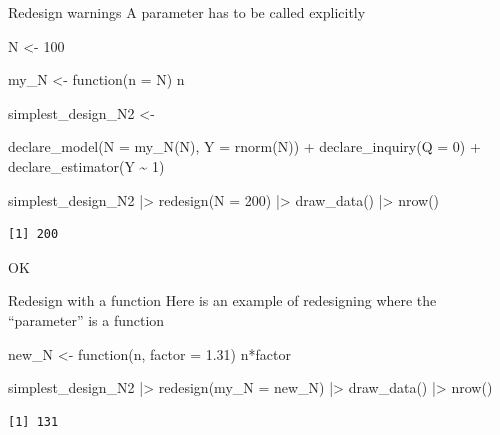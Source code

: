 \documentclass[
  11pt,
  ignorenonframetext,
]{beamer}
\newenvironment{Shaded}{\begin{snugshade}}{\end{snugshade}}
\newcommand{\AttributeTok}[1]{\textcolor[rgb]{0.40,0.45,0.13}{#1}}
\newcommand{\ControlFlowTok}[1]{\textcolor[rgb]{0.00,0.23,0.31}{#1}}
\newcommand{\DecValTok}[1]{\textcolor[rgb]{0.68,0.00,0.00}{#1}}
\newcommand{\FloatTok}[1]{\textcolor[rgb]{0.68,0.00,0.00}{#1}}
\newcommand{\FunctionTok}[1]{\textcolor[rgb]{0.28,0.35,0.67}{#1}}
\newcommand{\NormalTok}[1]{\textcolor[rgb]{0.00,0.23,0.31}{#1}}
\newcommand{\OtherTok}[1]{\textcolor[rgb]{0.00,0.23,0.31}{#1}}
\newcommand{\SpecialCharTok}[1]{\textcolor[rgb]{0.37,0.37,0.37}{#1}}
\begin{document}
\begin{frame}[fragile]{Redesign warnings}
\protect\hypertarget{redesign-warnings-2}{}
A parameter has to be called explicitly

\begin{Shaded}
\begin{Highlighting}[]
\NormalTok{N }\OtherTok{\textless{}{-}} \DecValTok{100}

\NormalTok{my\_N }\OtherTok{\textless{}{-}} \ControlFlowTok{function}\NormalTok{(}\AttributeTok{n =}\NormalTok{ N) n}

\NormalTok{simplest\_design\_N2 }\OtherTok{\textless{}{-}} 
  
  \FunctionTok{declare\_model}\NormalTok{(}\AttributeTok{N =} \FunctionTok{my\_N}\NormalTok{(N), }\AttributeTok{Y =} \FunctionTok{rnorm}\NormalTok{(N)) }\SpecialCharTok{+}
  \FunctionTok{declare\_inquiry}\NormalTok{(}\AttributeTok{Q =} \DecValTok{0}\NormalTok{) }\SpecialCharTok{+}
  \FunctionTok{declare\_estimator}\NormalTok{(Y }\SpecialCharTok{\textasciitilde{}} \DecValTok{1}\NormalTok{)}

\NormalTok{simplest\_design\_N2 }\SpecialCharTok{|\textgreater{}} \FunctionTok{redesign}\NormalTok{(}\AttributeTok{N =} \DecValTok{200}\NormalTok{) }\SpecialCharTok{|\textgreater{}} \FunctionTok{draw\_data}\NormalTok{() }\SpecialCharTok{|\textgreater{}} \FunctionTok{nrow}\NormalTok{()}
\end{Highlighting}
\end{Shaded}

\begin{verbatim}
[1] 200
\end{verbatim}

OK
\end{frame}

\begin{frame}[fragile]{Redesign with a function}
\protect\hypertarget{redesign-with-a-function}{}
Here is an example of redesigning where the ``parameter'' is a function

\begin{Shaded}
\begin{Highlighting}[]
\NormalTok{new\_N }\OtherTok{\textless{}{-}} \ControlFlowTok{function}\NormalTok{(n, }\AttributeTok{factor =} \FloatTok{1.31}\NormalTok{) n}\SpecialCharTok{*}\NormalTok{factor}

\NormalTok{simplest\_design\_N2 }\SpecialCharTok{|\textgreater{}} \FunctionTok{redesign}\NormalTok{(}\AttributeTok{my\_N =}\NormalTok{ new\_N) }\SpecialCharTok{|\textgreater{}} \FunctionTok{draw\_data}\NormalTok{() }\SpecialCharTok{|\textgreater{}} \FunctionTok{nrow}\NormalTok{()}
\end{Highlighting}
\end{Shaded}

\begin{verbatim}
[1] 131
\end{verbatim}
\end{frame}
\end{document}
